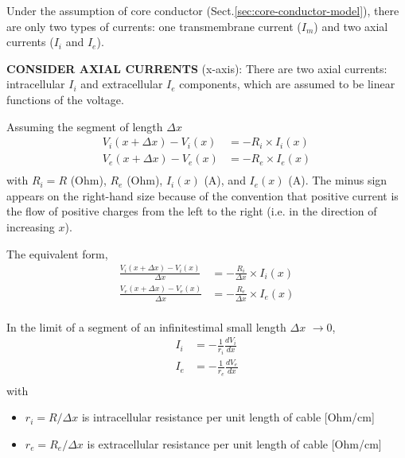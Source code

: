 Under the assumption of core conductor (Sect.\ref{sec:core-conductor-model}),
there are only two types of currents: one transmembrane current ($I_m$) and two
axial currents ($I_i$ and $I_e$).


{\bf CONSIDER AXIAL CURRENTS} (x-axis): There are two axial currents:
intracellular $I_i$ and extracellular $I_e$ components, which are assumed to be
linear functions of the voltage.

Assuming the segment of length $\Delta x$
\begin{equation}
  \label{eq:421}
  \begin{split}
    V_i(x+\Delta x)-V_i(x) &= -R_i \times I_i(x)\\
    V_e(x+\Delta x)-V_e(x) &= -R_e \times I_e(x)\\
  \end{split}
\end{equation}
with $R_i=R$ (Ohm), $R_e$ (Ohm), $I_i(x)$ (A), and $I_e(x)$ (A).
The minus sign appears on the right-hand size because of the convention that
positive current is the flow of positive charges from the left to the right
(i.e. in the direction of increasing $x$).

The equivalent form, 
\begin{equation}
  \label{eq:421_b}
  \begin{split}
    \frac{V_i(x+\Delta x)-V_i(x)}{\Delta x} &= -\frac{R_i}{\Delta x} \times I_i(x)\\
    \frac{V_e(x+\Delta x)-V_e(x)}{\Delta x} &= -\frac{R_e}{\Delta x} \times I_e(x)\\
  \end{split}
\end{equation}

In the limit of a segment of an infinitestimal small length $\Delta x$
$\rightarrow 0$,
\begin{equation}
  \label{eq:422}
  \begin{split}
    I_i &= -\frac{1}{r_i}\frac{d V_i}{d x} \\
    I_e &= -\frac{1}{r_e}\frac{d V_e}{d x} \\
  \end{split}
\end{equation}
with 
\begin{itemize}
  \item $r_i = R/\Delta x$ is intracellular resistance per unit length of cable
[Ohm/cm]

  \item $r_e = R_e/\Delta x$ is extracellular resistance per unit length of
  cable [Ohm/cm]
\end{itemize}

